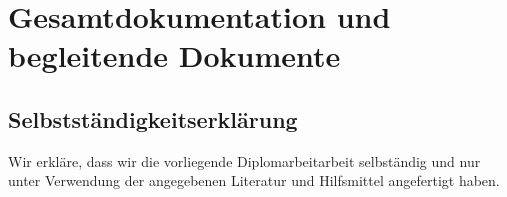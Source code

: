\chapter[Gesamtdokumentation]{Gesamtdokumentation und begleitende Dokumente}

\section{Selbstständigkeitserklärung}

Wir erkläre, dass wir die vorliegende Diplomarbeitarbeit selbständig und nur unter Verwendung der angegebenen Literatur und Hilfsmittel angefertigt haben.
\vspace{2cm}

